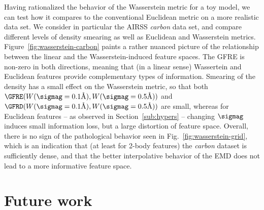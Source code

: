 Having rationalized the behavior of the Wasserstein metric for a toy model, we can test how it compares to the conventional Euclidean metric on a more realistic data set. We consider in particular the AIRSS \emph{carbon} data set, and compare different levels of density smearing as well as Euclidean and Wasserstein metrics. 
Figure~\ref{fig:wasserstein-carbon} paints a rather nuanced picture of the relationship between the linear and the Wasserstein-induced feature spaces. 
The GFRE is non-zero in both directions, meaning that (in a linear sense) Wassertein and Euclidean features provide complementary types of information. 
Smearing of the density has a small effect on the Wasserstein metric, so that both $\GFRE(W(\sigmag=0.1\text{\AA}),W(\sigmag=0.5\text{\AA}))$ and $\GFRD(W(\sigmag=0.1\text{\AA}),W(\sigmag=0.5\text{\AA}))$ are small, whereas for Euclidean features -- as observed in Section~\ref{sub:hypers} -- changing $\sigmag$ induces small information loss, but a large distortion of feature space. 
Overall, there is no sign of the pathological behavior seen in Fig.~\ref{fig:wasserstein-grid}, which is an indication that (at least for 2-body features) the \emph{carbon} dataset is sufficiently dense, and that the better interpolative behavior of the EMD does not lead to a more informative feature space. 




\section{Future work}

